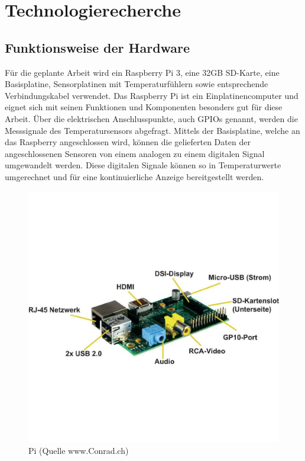 \section{Technologierecherche}
\subsection{Funktionsweise der Hardware}
Für die geplante Arbeit wird ein Raspberry Pi 3, eine 32GB SD-Karte, eine Basisplatine, Sensorplatinen mit Temperaturfühlern sowie entsprechende Verbindungskabel verwendet. Das Raspberry Pi ist ein Einplatinencomputer und eignet sich mit seinen Funktionen und Komponenten besonders gut für diese Arbeit. Über die elektrischen Anschlusspunkte, auch GPIOs genannt, werden die Messsignale des Temperatursensors abgefragt. Mittels der Basisplatine, welche an das Raspberry angeschlossen wird, können die gelieferten Daten der angeschlossenen Sensoren von einem analogen zu einem digitalen Signal umgewandelt werden.
Diese digitalen Signale können so in Temperaturwerte umgerechnet und für eine kontinuierliche Anzeige bereitgestellt werden.

\begin{figure}[H]%
\centering
\includegraphics[width=1\textwidth]{Images/RaspberryPi.jpg}
\caption{Pi (Quelle www.Conrad.ch)}
\label{fig:raspi}
\end{figure}

